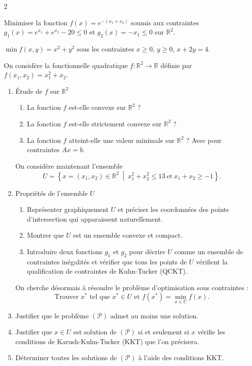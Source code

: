 \begin{multicols}{2}
\begin{exo}
	Minimiser la fonction $f(x) = e^{-(x_{1} + x_{2})}$ soumis aux contraintes $g_{1}(x) = e^{x_{1}} + e^{x_{2}} - 20 \leqslant 0$ et $g_{2}(x) = -x_{1} \leqslant 0$ sur $\mathbb{R}^{2}$.
\end{exo}

\begin{exo}
	$\min f(x, y) = x^{2} + y^{2}$ sous les contraintes $x \geqslant 0$, $y \geqslant 0$, $x + 2y = 4$.
\end{exo}

\begin{exo}
	On considère la fonctionnelle quadratique $f : \mathbb{R}^{2} \rightarrow \mathbb{R}$ définie par $f(x_{1}, x_{2}) = x_{1}^{2} + x_{2}$.
	\begin{enumerate}[label=\arabic*.]
		\item Étude de $f$ sur $\mathbb{R}^{2}$
		\begin{enumerate}[label=\alph*.]
			\item La fonction $f$ est-elle convexe sur $\mathbb{R}^{2}$ ?
			\item La fonction $f$ est-elle strictement convexe sur $\mathbb{R}^{2}$ ?
			\item La fonction $f$ atteint-elle une valeur minimale sur $\mathbb{R}^{2}$ ? Avec pour contraintes $Ax = b$.
		\end{enumerate}
		On considère maintenant l'ensemble
		\[
		U = \left\{ x = (x_{1}, x_{2}) \in \mathbb{R}^{2} \ \middle| \ x_{1}^{2} + x_{2}^{2} \leqslant 13 \ \text{et} \ x_{1} + x_{2} \geqslant -1 \right\}.
		\]
		\item Propriétés de l'ensemble $U$
		\begin{enumerate}[label=\alph*.]
			\item Représenter graphiquement $U$ et préciser les coordonnées des points d'intersection qui apparaissent naturellement.
			\item Montrer que $U$ est un ensemble convexe et compact.
			\item Introduire deux fonctions $g_{1}$ et $g_{2}$ pour décrire $U$ comme un ensemble de contraintes inégalités et vérifier que tous les points de $U$ vérifient la qualification de contraintes de Kuhn-Tucker (QCKT).
		\end{enumerate}
		On cherche désormais à résoudre le problème d'optimisation sous contraintes :
		\[
		\text{Trouver } x^{*} \text{ tel que } x^{*} \in U \text{ et } f(x^{*}) = \min_{x \in U} f(x).
		\]
		\item Justifier que le problème $(\mathcal{P})$ admet au moins une solution.
		\item Justifier que $x \in U$ est solution de $(\mathcal{P})$ si et seulement si $x$ vérifie les conditions de Karush-Kuhn-Tucker (KKT) que l'on précisera.
		\item Déterminer toutes les solutions de $(\mathcal{P})$ à l'aide des conditions KKT.
	\end{enumerate}
\end{exo}


\end{multicols}
